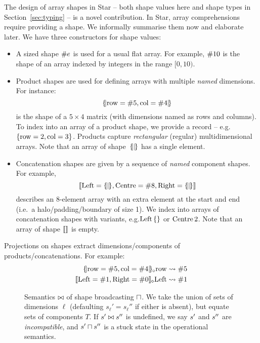 The design of array shapes in Star -- both shape values here and shape types in Section~\ref{sec:typing} -- is a novel contribution.
In Star, array comprehensions require providing a shape.
We informally summarise them now and elaborate later. 
We have three constructors for shape values:
\begin{itemize}
    \item A sized shape $\#{e}$ is used for a usual flat array. For example, $\#{10}$ is the shape of an array indexed by integers in the range $[ 0, 10)$.
    \item Product shapes are used for defining arrays with multiple \textit{named} dimensions. For instance: 
    $$\sproductval{\mathrm{row} = \ssize{5}, \mathrm{col} = \ssize{4}}$$ 
    is the shape of a $5 \times 4$ matrix (with dimensions named as rows and columns). To index into an array of a product shape, we provide a record -- e.g.\@ $\srecordval{\mathrm{row} = 2, \mathrm{col} = 3}$.
    Products capture \textit{rectangular} (regular) multidimensional arrays.
    Note that an array of shape~$\sproductval{}$ has a single element.
    \item Concatenation shapes are given by a sequence of \textit{named} component shapes. For example,
    $$\sconcatval{ \mathrm{Left}= \sproductval{}, \mathrm{Centre}= \ssize{8}, \mathrm{Right}= \sproductval{} }$$
    describes an 8-element array with an extra element at the start and end (i.e.\ a halo/padding/boundary of size 1). We index into arrays of concatenation shapes with variants, e.g.\@ $\stag{\mathrm{Left}}{\srecordval{}}$ or ${\mathrm{Centre}}\,{2}$.
    Note that an array of shape $\sconcatval{}$ is empty.
\end{itemize}
Projections on shapes extract dimensions/components of products/concatenations. For example: 
\begin{align*}
\sproductproj{ \sproductval{\mathrm{row} = \ssize{5}, \mathrm{col} = \ssize{4}}}{\mathrm{row}} &\step \ssize 5 \\
\sconcatproj{\sconcatval{ \mathrm{Left}= \ssize{1}, \mathrm{Right}= \ssize{0}}}{\mathrm{Left}} &\step \ssize 1
\end{align*}

\begin{figure}
    \centering
    
    \caption{
        Semantics $\bowtie$ of shape broadcasting $\sqcap$. 
        We take the union of sets of dimensions $\ell$ (defaulting $s_\ell' = s_\ell''$ if either is absent), but equate sets of components $T$. 
        If $s' \bowtie s''$ is undefined, we say $s'$ and $s''$ are \emph{incompatible}, and ${s'} \sqcap {s''}$ is a stuck state in the operational semantics.
    }
    \label{fig:broadcasting}
\end{figure}

